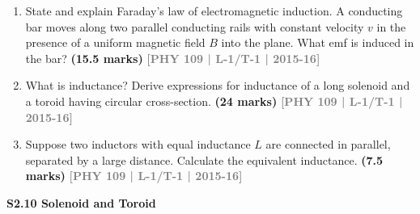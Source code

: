 \documentclass[12pt,a3paper]{article}
\newcommand{\yr}[1]{\hfill\textcolor{gray}{\small\textbf{[#1]}}}
\newcommand{\mk}[1]{\textcolor{orange!70!black}{\small\textbf{(#1 marks)}}}
\newcommand{\subtopic}[2]{%
  \vspace{10pt}
  \noindent\begin{tcolorbox}[colback=#1!8,colframe=#1,boxrule=0.6pt,arc=4pt,
    left=6pt,right=6pt,top=4pt,bottom=4pt]
    \small\bfseries\textcolor{#1}{#2}
  \end{tcolorbox}
  \vspace{2pt}
}
\begin{document}
\begin{enumerate}
\item State and explain Faraday's law of electromagnetic induction. A conducting bar moves along two parallel conducting rails with constant velocity $v$ in the presence of a uniform magnetic field $B$ into the plane. What emf is induced in the bar?
\mk{15.5} \yr{PHY 109 | L-1/T-1 | 2015-16}

\item What is inductance? Derive expressions for inductance of a long solenoid and a toroid having circular cross-section.
\mk{24} \yr{PHY 109 | L-1/T-1 | 2015-16}

\item Suppose two inductors with equal inductance $L$ are connected in parallel, separated by a large distance. Calculate the equivalent inductance.
\mk{7.5} \yr{PHY 109 | L-1/T-1 | 2015-16}

\end{enumerate}

\label{sec:s210}
\subtopic{cA}{S2.10 \quad Solenoid and Toroid}
\end{document}
